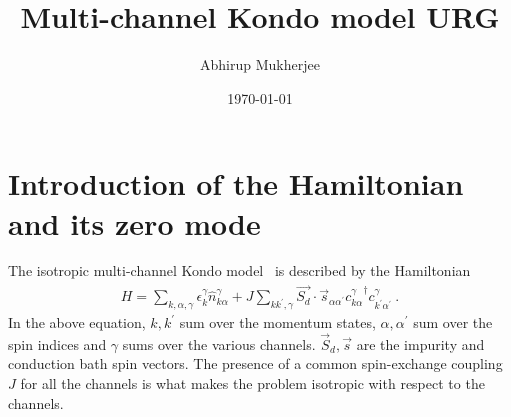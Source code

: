 \documentclass[12pt]{revtex4-2}
\begin{document}
\title{Multi-channel Kondo model URG}
\author{Abhirup Mukherjee}
\date{\today}
\maketitle
\tableofcontents
\section{Introduction of the Hamiltonian and its zero mode}
The isotropic multi-channel Kondo model~\cite{Noz_blandin_1980,Gan_Andrei_Coleman_1993,emery_kivelson,Gan_mchannel_1994,Tsvelick_Weigmann_mchannel_1984,Tsvelick_weigmann_mchannel_1985,parcollet_olivier_large_N,kimura_taro_Su_N_kondo,PhysRevB.73.224445,cox_jarrell_two_channel_rev,affleck_1991_overscreen,Coleman_tsvelik,affleck1993exact} is described by the Hamiltonian
\begin{align}
	\label{mc_ham}
	H = \sum_{k,\alpha,\gamma}\epsilon_{k}^\gamma \hat n^\gamma_{k\alpha} + J\sum_{kk^\prime,\gamma} \vec{S_d}\cdot\vec{s}_{\alpha\alpha^\prime}{c^\gamma_{k\alpha}}^\dagger c^\gamma_{k^\prime\alpha^\prime}~.
\end{align}
In the above equation, \(k,k^\prime\) sum over the momentum states, \(\alpha,\alpha^\prime\) sum over the spin indices and \(\gamma\) sums over the various channels. \(\vec S_d, \vec s\) are the impurity and conduction bath spin vectors. The presence of a common spin-exchange coupling \(J\) for all the channels is what makes the problem isotropic with respect to the channels.
\end{document}
